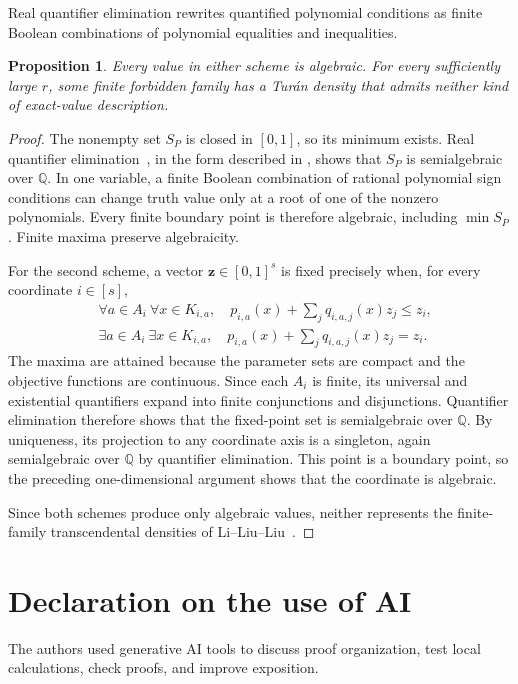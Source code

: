 \documentclass[10pt]{article}
\numberwithin{equation}{section}
\newtheorem{proposition}[proposition]{Proposition}\aliascntresetthe{proposition}
\theoremstyle{definition}
\begin{document}
Real quantifier elimination rewrites quantified polynomial conditions as finite Boolean combinations of polynomial equalities and inequalities.
\begin{proposition}\label{prop:algebraicity}
Every value in either scheme is algebraic. For every sufficiently large $r$, some finite forbidden family has a Tur\'an density that admits neither kind of exact-value description.
\end{proposition}
\begin{proof}
The nonempty set $S_P$ is closed in $[0,1]$, so its minimum exists. Real quantifier elimination~\cite{Tarski1951}, in the form described in \cite[Chapter~14]{BasuPollackRoy2006}, shows that $S_P$ is semialgebraic over $\mathbb Q$. In one variable, a finite Boolean combination of rational polynomial sign conditions can change truth value only at a root of one of the nonzero polynomials. Every finite boundary point is therefore algebraic, including $\min S_P$. Finite maxima preserve algebraicity.

For the second scheme, a vector $\boldsymbol z\in[0,1]^s$ is fixed precisely when, for every coordinate $i\in[s]$,
\[
 \begin{aligned}
 &\forall a\in A_i\ \forall x\in K_{i,a},\quad
 p_{i,a}(x)+\sum_jq_{i,a,j}(x)z_j\le z_i,\\
 &\exists a\in A_i\ \exists x\in K_{i,a},\quad
 p_{i,a}(x)+\sum_jq_{i,a,j}(x)z_j=z_i.
 \end{aligned}
\]
The maxima are attained because the parameter sets are compact and the objective functions are continuous. Since each $A_i$ is finite, its universal and existential quantifiers expand into finite conjunctions and disjunctions. Quantifier elimination therefore shows that the fixed-point set is semialgebraic over $\mathbb Q$. By uniqueness, its projection to any coordinate axis is a singleton, again semialgebraic over $\mathbb Q$ by quantifier elimination. This point is a boundary point, so the preceding one-dimensional argument shows that the coordinate is algebraic.

Since both schemes produce only algebraic values, neither represents the finite-family transcendental densities of Li--Liu--Liu~\cite[Theorem 1.1]{LiLiuLiu2026}.
\end{proof}

\section*{Declaration on the use of AI}
The authors used generative AI tools to discuss proof organization, test local calculations, check proofs, and improve exposition.
\end{document}

